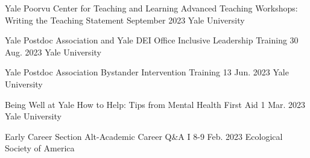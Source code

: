 \begin{cventries}

  \cventry
    {Yale Poorvu Center for Teaching and Learning} %
    {Advanced Teaching Workshops: Writing the Teaching Statement} %
    {September 2023} %
    {Yale University} %
    {
    }


  \cventry
    {Yale Postdoc Association and Yale DEI Office} %
    {Inclusive Leadership Training} %
    {30 Aug. 2023} %
    {Yale University} %
    {
    }

  \cventry
    {Yale Postdoc Association} %
    {Bystander Intervention Training} %
    {13 Jun. 2023} %
    {Yale University} %
    {
    }

  \cventry
    {Being Well at Yale} %
    {How to Help: Tips from Mental Health First Aid} %
    {1 Mar. 2023} %
    {Yale University} %
    {
    }

  \cventry
    {Early Career Section} %
    {Alt-Academic Career Q\&A I} %
    {8-9 Feb. 2023} %
    {Ecological Society of America} %
    {
    }    


\end{cventries}
